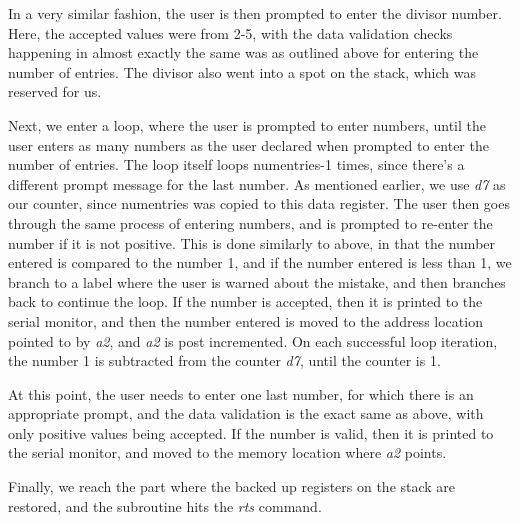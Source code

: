 \documentclass[letterpaper]{article}
\begin{document}
    In a very similar fashion, the user is then prompted to enter the divisor number.
    Here, the accepted values were from 2-5, with the data validation checks happening in
    almost exactly the same was as outlined above for entering the number of entries.
    The divisor also went into a spot on the stack, which was reserved for us.

    Next, we enter a loop, where the user is prompted to enter numbers, until
    the user enters as many numbers as the user declared when prompted to enter the number of entries.
    The loop itself loops numentries-1 times, since there's a different prompt message for the
    last number. As mentioned earlier, we use \textit{d7} as our counter, since numentries was
    copied to this data register. The user then goes through the same process of
    entering numbers, and is prompted to re-enter the number if it is not positive.
    This is done similarly to above, in that the number entered is compared to the
    number 1, and if the number entered is less than 1, we branch to a label where
    the user is warned about the mistake, and then branches back to continue the loop.
    If the number is accepted, then it is printed to the serial monitor, and then the
    number entered is moved to the address location pointed to by \textit{a2}, and \textit{a2} is post
    incremented. On each successful loop iteration, the number 1 is subtracted from
    the counter \textit{d7}, until the counter is 1.

    At this point, the user needs to enter one last number, for which there is
    an appropriate prompt, and the data validation is the exact same as above,
    with only positive values being accepted. If the number is valid, then it is
    printed to the serial monitor, and moved to the memory location where \textit{a2} points.

    Finally, we reach the part where the backed up registers on the stack are restored,
    and the subroutine hits the \textit{rts} command.

\end{document}

